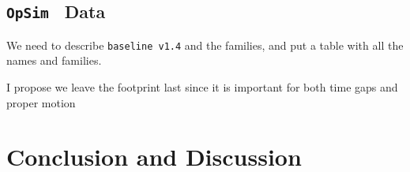 \documentclass[onecolumn, 10pt]{aastex63}
\newcommand{\question}[1]{{\color{red} #1}}
\newcommand{\opsim}{\texttt{OpSim}}
\begin{document}
\subsection{\opsim~ Data}
\question{We need to describe \texttt{baseline v1.4} and the families, and put a table with all the names and families.}








\question{I propose we leave the footprint last since it is important for both time gaps and proper motion}

\section{Conclusion and Discussion}
\end{document}
